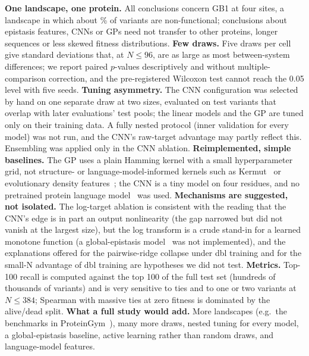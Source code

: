\textbf{One landscape, one protein.} All conclusions concern GB1 at four sites, a landscape in which about \% of variants are non-functional; conclusions about epistasis features, CNNs or GPs need not transfer to other proteins, longer sequences or less skewed fitness distributions.
\textbf{Few draws.} Five draws per cell give standard deviations that, at $N\le96$, are as large as most between-system differences; we report paired $p$-values descriptively and without multiple-comparison correction, and the pre-registered Wilcoxon test cannot reach the 0.05 level with five seeds.
\textbf{Tuning asymmetry.} The CNN configuration was selected by hand on one separate draw at two sizes, evaluated on test variants that overlap with later evaluations' test pools; the linear models and the GP are tuned only on their training data. A fully nested protocol (inner validation for every model) was not run, and the CNN's raw-target advantage may partly reflect this. Ensembling was applied only in the CNN ablation.
\textbf{Reimplemented, simple baselines.} The GP uses a plain Hamming kernel with a small hyperparameter grid, not structure- or language-model-informed kernels such as Kermut~\cite{groth2024kermut} or evolutionary density features~\cite{hsu2022learning}; the CNN is a tiny model on four residues, and no pretrained protein language model~\cite{meier2021language,rao2019evaluating} was used.
\textbf{Mechanisms are suggested, not isolated.} The log-target ablation is consistent with the reading that the CNN's edge is in part an output nonlinearity (the gap narrowed but did not vanish at the largest size), but the log transform is a crude stand-in for a learned monotone function (a global-epistasis model~\cite{otwinowski2018inferring} was not implemented), and the explanations offered for the pairwise-ridge collapse under dbl training and for the small-N advantage of dbl training are hypotheses we did not test.
\textbf{Metrics.} Top-100 recall is computed against the top 100 of the full test set (hundreds of thousands of variants) and is very sensitive to ties and to one or two variants at $N\le384$; Spearman with massive ties at zero fitness is dominated by the alive/dead split.
\textbf{What a full study would add.} More landscapes (e.g.\ the benchmarks in ProteinGym~\cite{notin2023proteingym}), many more draws, nested tuning for every model, a global-epistasis baseline, active learning rather than random draws, and language-model features.
